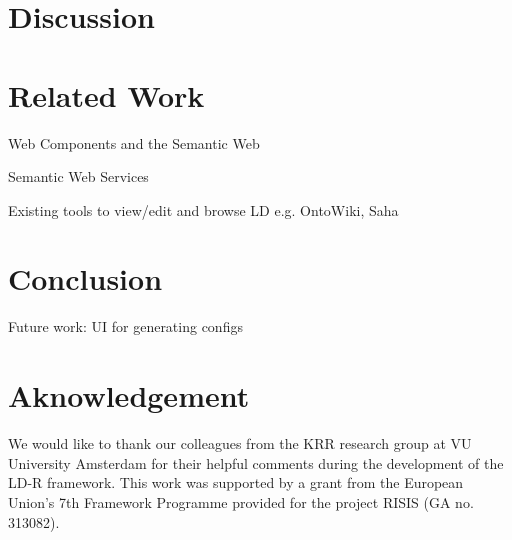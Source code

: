 \documentclass{acm_proc_article-sp}
\begin{document}
\section{Discussion}

\section{Related Work}

Web Components and the Semantic Web~\cite{pahl2011}

Semantic Web Services

Existing tools to view/edit and browse LD e.g. OntoWiki, Saha


\section{Conclusion}

Future work: UI for generating configs

\section{Aknowledgement}
We would like to thank our colleagues from the KRR research group at VU University Amsterdam for their helpful comments during the development of the LD-R framework. This work was supported by a grant from the European Union's 7th Framework Programme provided for the project RISIS (GA no. 313082).




\end{document}
